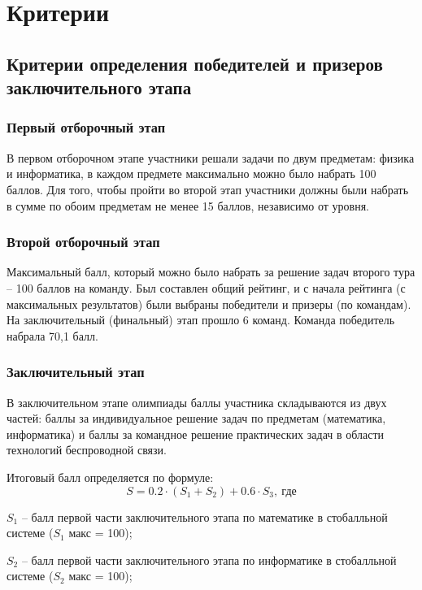 \part{Критерии}

\chapter{Критерии определения победителей и призеров заключительного этапа}

\section{Первый отборочный этап}

В первом отборочном этапе участники решали задачи по двум предметам: физика и информатика, в каждом предмете максимально можно было набрать 100 баллов. Для того, чтобы пройти во второй этап участники  должны были набрать в сумме по обоим предметам не менее 15 баллов, независимо от уровня.

\section{Второй отборочный этап}

Максимальный балл, который можно было набрать за решение задач второго тура – 100 баллов на команду. Был составлен общий рейтинг, и с начала рейтинга (с максимальных результатов) были выбраны победители и призеры (по командам). На заключительный (финальный) этап прошло 6 команд. Команда победитель набрала 70,1 балл.   

\section{Заключительный этап}

В заключительном этапе олимпиады баллы участника складываются из двух частей: баллы за индивидуальное решение задач по предметам (математика, информатика) и баллы за командное решение практических задач в области технологий беспроводной связи.

Итоговый балл определяется по формуле: $$S = 0.2 \cdot (S_1+S_2) + 0.6 \cdot S_3, \: \text{где}$$

$S_1$ – балл первой части заключительного этапа по математике в стобалльной системе ($S_1$ макс = 100);

$S_2$ – балл первой части заключительного этапа по информатике в стобалльной системе ($S_2$ макс = 100);


